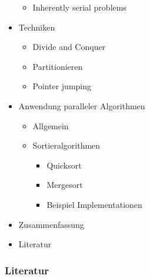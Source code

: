 \begin{frame}[allowframebreaks]
\begin{itemize}
\begin{itemize}
                \item Inherently serial problems
            \end{itemize}
        \item Techniken
            \begin{itemize}
                \item Divide and Conquer
                \item Partitionieren
                \item Pointer jumping
            \end{itemize}
        \framebreak
        \item Anwendung paralleler Algorithmen
            \begin{itemize}
                \item Allgemein
                \item Sortieralgorithmen
                    \begin{itemize}
                        \item Quicksort
                        \item Mergesort
                        \item Beispiel Implementationen
                    \end{itemize}
            \end{itemize}
        \item Zusammenfassung
        \item Literatur
    \end{itemize}
\nocite{*}
\end{frame}



\begin{frame}[allowframebreaks]
\frametitle{Literatur}
    \printbibliography   
\end{frame}


